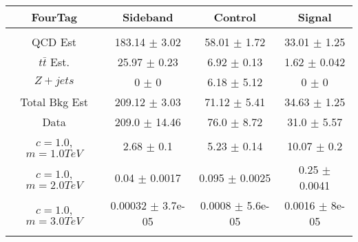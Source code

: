 \begin{footnotesize} 
\begin{tabular}{c|c|c|c} 
FourTag & Sideband & Control & Signal \\ 
\hline\hline 
& & & \\ 
QCD Est & 183.14 $\pm$ 3.02 & 58.01 $\pm$ 1.72 & 33.01 $\pm$ 1.25\\ 
$t\bar{t}$ Est.  & 25.97 $\pm$ 0.23 & 6.92 $\pm$ 0.13 & 1.62 $\pm$ 0.042\\ 
$Z+jets$ & 0 $\pm$ 0 & 6.18 $\pm$ 5.12 & 0 $\pm$ 0\\ 
Total Bkg Est & 209.12 $\pm$ 3.03 & 71.12 $\pm$ 5.41 & 34.63 $\pm$ 1.25\\ 
Data & 209.0 $\pm$ 14.46 & 76.0 $\pm$ 8.72 & 31.0 $\pm$ 5.57\\ 
$c=1.0$,$m=1.0TeV$ & 2.68 $\pm$ 0.1 & 5.23 $\pm$ 0.14 & 10.07 $\pm$ 0.2\\ 
$c=1.0$,$m=2.0TeV$ & 0.04 $\pm$ 0.0017 & 0.095 $\pm$ 0.0025 & 0.25 $\pm$ 0.0041\\ 
$c=1.0$,$m=3.0TeV$ & 0.00032 $\pm$ 3.7e-05 & 0.0008 $\pm$ 5.6e-05 & 0.0016 $\pm$ 8e-05\\ 
& & & \\ 
\hline\hline 
\end{tabular} 
\end{footnotesize} 
\newline 
